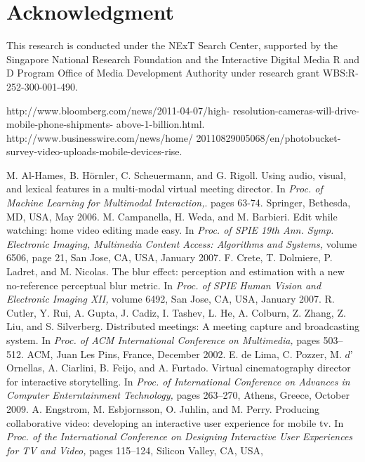 \documentclass{sig-alternate-05-2015}
\begin{document}
\section{Acknowledgment}
This research is conducted under the NExT Search Center, supported by the Singapore National Research Foundation and the Interactive Digital Media R and D Program Office of Media Development Authority under research grant WBS:R-252-300-001-490.

\begin{thebibliography}{9}
http://www.bloomberg.com/news/2011-04-07/high-
resolution-cameras-will-drive-mobile-phone-shipments-
above-1-billion.html. 
http://www.businesswire.com/news/home/
20110829005068/en/photobucket-survey-video-uploads-mobile-devices-rise. 
 
M. Al-Hames, B. Hörnler, C. Scheuermann, and G. Rigoll.
Using audio, visual, and lexical features in a multi-modal
virtual meeting director. In 
\textit{Proc. of Machine Learning for
Multimodal Interaction,}.
pages 63-74. Springer, Bethesda,
MD, USA, May 2006.
M. Campanella, H. Weda, and M. Barbieri. Edit while
watching: home video editing made easy. In \textit{Proc. of SPIE
19th Ann. Symp. Electronic Imaging, Multimedia Content
Access: Algorithms and Systems,} volume 6506, page 21, San
Jose, CA, USA, January 2007.
F. Crete, T. Dolmiere, P. Ladret, and M. Nicolas. The blur
effect: perception and estimation with a new no-reference
perceptual blur metric. In \textit{Proc. of SPIE Human Vision and
Electronic Imaging XII,} volume 6492, San Jose, CA, USA,
January 2007.
R. Cutler, Y. Rui, A. Gupta, J. Cadiz, I. Tashev, L. He,
A. Colburn, Z. Zhang, Z. Liu, and S. Silverberg. Distributed
meetings: A meeting capture and broadcasting system. In
\textit{Proc. of ACM International Conference on Multimedia,}
pages 503–512. ACM, Juan Les Pins, France, December
2002.
 E. de Lima, C. Pozzer, M. $d’$Ornellas, A. Ciarlini, B. Feijo,
and A. Furtado. Virtual cinematography director for
interactive storytelling. In \textit{Proc. of International Conference
on Advances in Computer Enterntainment Technology,} pages
263–270, Athens, Greece, October 2009.
A. Engstrom, M. Esbjornsson, O. Juhlin, and M. Perry.
Producing collaborative video: developing an interactive user
experience for mobile tv. In \textit{Proc. of the International
Conference on Designing Interactive User Experiences for
TV and Video, }pages 115–124, Silicon Valley, CA, USA,

\end{thebibliography}
\end{document}
